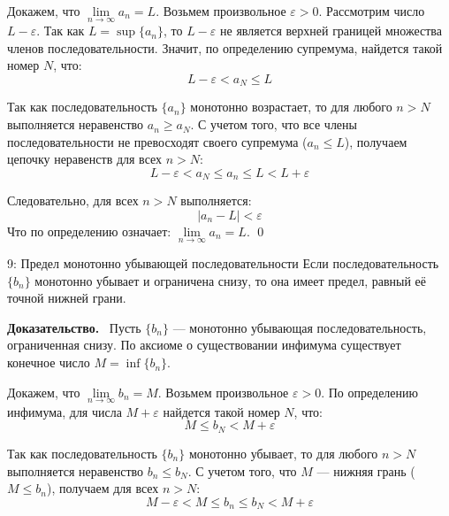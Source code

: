 \documentclass[a4paper,12pt]{article}
\newcommand{\myproof}{\textbf{Доказательство.}\ }
\begin{document}
	Докажем, что $\lim\limits_{n \to \infty} a_n = L$.
	Возьмем произвольное $\varepsilon > 0$. Рассмотрим число $L - \varepsilon$.
	Так как $L = \sup \{a_n\}$, то $L - \varepsilon$ не является верхней границей множества членов последовательности. Значит, по определению супремума, найдется такой номер $N$, что:
	\[ L - \varepsilon < a_N \le L \]
	
	Так как последовательность $\{a_n\}$ монотонно возрастает, то для любого $n > N$ выполняется неравенство $a_n \ge a_N$. С учетом того, что все члены последовательности не превосходят своего супремума ($a_n \le L$), получаем цепочку неравенств для всех $n > N$:
	\[ L - \varepsilon < a_N \le a_n \le L < L + \varepsilon \]
	
	Следовательно, для всех $n > N$ выполняется:
	\[ |a_n - L| < \varepsilon \]
	Что по определению означает: $\lim\limits_{n \to \infty} a_n = L$. \qed
	
	\begin{center}
	\end{center}
	
	
	
	
	
	
	\newpage
	\begin{theorembox}{9: Предел монотонно убывающей последовательности}
		Если последовательность $\{b_n\}$ монотонно убывает и ограничена снизу, то она имеет предел, равный её точной нижней грани.
	\end{theorembox}
	
	\vspace{0.5cm}
	\myproof
	Пусть $\{b_n\}$ — монотонно убывающая последовательность, ограниченная снизу. По аксиоме о существовании инфимума существует конечное число $M = \inf \{b_n\}$. 
	
	Докажем, что $\lim\limits_{n \to \infty} b_n = M$.
	Возьмем произвольное $\varepsilon > 0$. По определению инфимума, для числа $M + \varepsilon$ найдется такой номер $N$, что:
	\[ M \le b_N < M + \varepsilon \]
	
	Так как последовательность $\{b_n\}$ монотонно убывает, то для любого $n > N$ выполняется неравенство $b_n \le b_N$. С учетом того, что $M$ — нижняя грань ($M \le b_n$), получаем для всех $n > N$:
	\[ M - \varepsilon < M \le b_n \le b_N < M + \varepsilon \]
	
\end{document}
